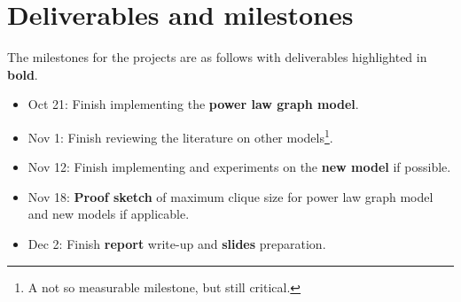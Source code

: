 \documentclass{article}
\begin{document}
\section{Deliverables and milestones}
The milestones for the projects are as follows with deliverables highlighted in \textbf{bold}.
\begin{itemize}
	\item Oct 21: Finish implementing the \textbf{power law graph model}.
	\item Nov 1: Finish reviewing the literature on other models\footnote{A not so measurable milestone, but still critical.}.
	\item Nov 12: Finish implementing and experiments on the \textbf{new model} if possible.
	\item Nov 18: \textbf{Proof sketch} of maximum clique size for power law graph model and new models if applicable.
	\item Dec 2: Finish \textbf{report} write-up and \textbf{slides} preparation.
\end{itemize}



{}

\end{document}

